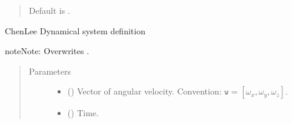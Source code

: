 \documentclass[a4paper,landscape,10pt,english]{sphinxmanual}
\begin{document}
\begin{fulllineitems}
\begin{fulllineitems}
\begin{quote}
\begin{description}
\begin{itemize}
Default is  .


\end{itemize}

\end{description}\end{quote}

\end{fulllineitems}


\begin{fulllineitems}
\label{\detokenize{code_docs/simulation_API.simulation:simulation_API.simulation.simulations.ChenLeeAttractor.dyn_sys_eqns}}
Chen\sphinxhyphen{}Lee Dynamical system definition

\begin{sphinxadmonition}{note}{Note:}
Overwrites {\hyperref[\detokenize{code_docs/simulation_API.simulation:simulation_API.simulation.simulations.Simulation.dyn_sys_eqns}]{}}.
\end{sphinxadmonition}
\begin{quote}\begin{description}
\item[{Parameters}] \leavevmode\begin{itemize}
\item {} 
 (\sphinxstyleliteralemphasis{\sphinxupquote{, }}\sphinxstyleliteralemphasis{\sphinxupquote{ (}}\sphinxstyleliteralemphasis{\sphinxupquote{,}}\sphinxstyleliteralemphasis{\sphinxupquote{)}}) \textendash{} Vector of angular velocity.
Convention: \(\texttt{w} = [\omega_x, \omega_y, \omega_z]\).

\item {} 
 () \textendash{} Time.


\end{itemize}
\end{description}
\end{quote}
\end{fulllineitems}
\end{fulllineitems}
\end{document}
